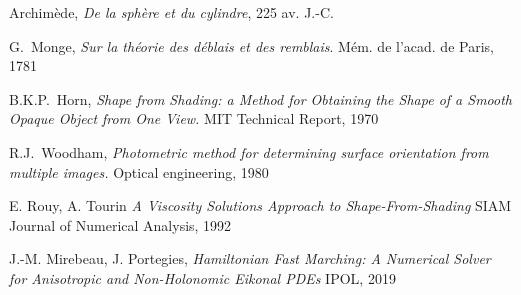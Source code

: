 \documentclass[a4paper,10pt]{article}
\begin{document}
    \vspace{-1.5em}
\renewcommand{\refname}{\normalsize Références}
%
\begin{thebibliography}{99}
\vspace{-1em}
{\footnotesize
{}
	Archimède, {\it De la sphère et du cylindre}, 225 av. J.-C.

	G.~Monge, {\it Sur la théorie des déblais et des remblais}.
		Mém. de l’acad. de Paris, 1781

	B.K.P.~Horn, {\it Shape from Shading: a Method for Obtaining the Shape
		of a Smooth Opaque Object from One View.}
		MIT Technical Report, 1970

	R.J.~Woodham, {\it Photometric method for determining surface
		orientation from multiple images.} Optical engineering, 1980

E. Rouy, A. Tourin
{\it A Viscosity Solutions Approach to Shape-From-Shading }
SIAM Journal of Numerical Analysis, 1992

	J.-M. Mirebeau, J. Portegies,
	{\it Hamiltonian Fast Marching: A Numerical Solver for Anisotropic and
Non-Holonomic Eikonal PDEs}
	IPOL, 2019

%
%
%
%
}
\end{thebibliography}
\end{document}
